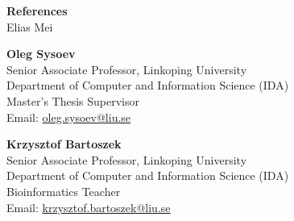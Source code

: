 \documentclass[11pt,a4paper]{article}
\begin{document}
\begin{center}
    {\LARGE \textbf{References}}\\
    \vspace{2mm}
    Elias Mei
\end{center}

\vspace{4mm}

\textbf{Oleg Sysoev}\\
Senior Associate Professor, Linkoping University\\
Department of Computer and Information Science (IDA)\\
Master's Thesis Supervisor\\
Email: \href{mailto:oleg.sysoev@liu.se}{oleg.sysoev@liu.se}

\vspace{4mm}

\textbf{Krzysztof Bartoszek}\\
Senior Associate Professor, Linkoping University\\
Department of Computer and Information Science (IDA)\\
Bioinformatics Teacher\\
Email: \href{mailto:krzysztof.bartoszek@liu.se}{krzysztof.bartoszek@liu.se}
\end{document}
